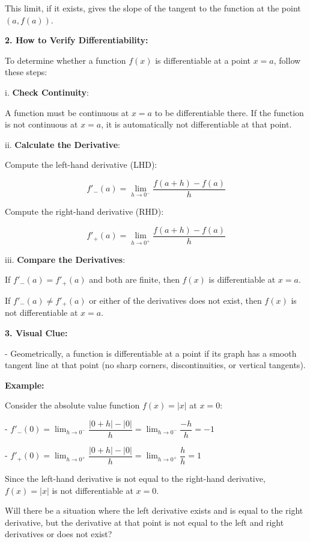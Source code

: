 \documentclass[a4paper,12pt]{book}
\begin{document}
This limit, if it exists, gives the slope of the tangent to the function at the point \( (a, f(a)) \).

\textbf{2. How to Verify Differentiability:}

To determine whether a function \( f(x) \) is differentiable at a point \( x = a \), follow these steps:

i. \textbf{Check Continuity}:

A function must be continuous at \( x = a \) to be differentiable there. If the function is not continuous at \( x = a \), it is automatically not differentiable at that point.

ii. \textbf{Calculate the Derivative}:

Compute the left-hand derivative (LHD):
   
     \[
     f'_-(a) = \lim_{h \to 0^-} \dfrac{f(a + h) - f(a)}{h}
     \]
     
Compute the right-hand derivative (RHD):
   
     \[
     f'_+(a) = \lim_{h \to 0^+} \dfrac{f(a + h) - f(a)}{h}
     \]

iii. \textbf{Compare the Derivatives}:

If \( f'_-(a) = f'_+(a) \) and both are finite, then \( f(x) \) is differentiable at \( x = a \).
   
If \( f'_-(a) \neq f'_+(a) \) or either of the derivatives does not exist, then \( f(x) \) is not differentiable at \( x = a \).

\textbf{3. Visual Clue:}

- Geometrically, a function is differentiable at a point if its graph has a smooth tangent line at that point (no sharp corners, discontinuities, or vertical tangents).

\textbf{Example:}

Consider the absolute value function \( f(x) = |x| \) at \( x = 0 \):

- \( f'_-(0) = \lim_{h \to 0^-} \dfrac{|0 + h| - |0|}{h} = \lim_{h \to 0^-} \dfrac{-h}{h} = -1 \)

- \( f'_+(0) = \lim_{h \to 0^+} \dfrac{|0 + h| - |0|}{h} = \lim_{h \to 0^+} \dfrac{h}{h} = 1 \)

Since the left-hand derivative is not equal to the right-hand derivative, \( f(x) = |x| \) is not differentiable at \( x = 0 \).

\begin{light_gray_box}
Will there be a situation where the left derivative exists and is equal to the right derivative, but the derivative at that point is not equal to the left and right derivatives or does not exist?
\end{light_gray_box}
\end{document}

